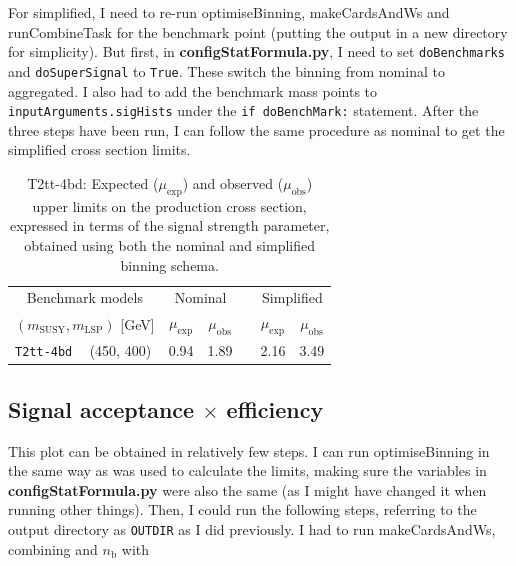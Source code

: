 For simplified, I need to re-run optimiseBinning, makeCardsAndWs and runCombineTask for the benchmark point (putting the output in a new directory for simplicity). But first, in \textbf{configStatFormula.py}, I need to set \texttt{doBenchmarks}  and \texttt{doSuperSignal} to \texttt{True}. These switch the binning from nominal to aggregated. I also had to add the benchmark mass points to \texttt{inputArguments.sigHists} under the \texttt{if doBenchMark:} statement. After the three steps have been run, I can follow the same procedure as nominal to get the simplified cross section limits.

\begin{table}[htbp]
  \centering
  \begin{tabular}{ llccccc }
    \hline
    \multicolumn{2}{c}{Benchmark models}    & \multicolumn{2}{c}{Nominal}
                                            &
                                            & \multicolumn{2}{c}{Simplified}             \\ [0.3ex]
    \cline{3-4}
    \cline{6-7}
    \multicolumn{2}{c}{$(m_{\text{SUSY}}, m_{\mathrm{LSP}})$ [GeV]}
                                            & $\mu_{\text{exp}}$
                                            & $\mu_{\text{obs}}$
                                            &
                                            & $\mu_{\text{exp}}$
                                            & $\mu_{\text{obs}}$                         \\ [0.3ex]
    \hline
    \texttt{T2tt-4bd} & (450, 400) & 0.94 & 1.89 & & 2.16 & 3.49 \\
        \hline
  \end{tabular}
  \caption{T2tt-4bd: Expected ($\mu_{\mathrm{exp}}$) and observed ($\mu_{\mathrm{obs}}$) upper limits on the production cross section, expressed in terms of the signal strength parameter, obtained using both the nominal and simplified binning schema.}
\end{table}

    
\subsection{Signal acceptance \texorpdfstring{$\times$}{x} efficiency}

This plot can be obtained in relatively few steps. I can run optimiseBinning in the same way as was used to calculate the limits, making sure the variables in \textbf{configStatFormula.py} were also the same (as I might have changed it when running other things). Then, I could run the following steps, referring to the output directory as \texttt{OUTDIR} as I did previously. I had to run makeCardsAndWs, combining \HT and $n_{\mathrm{b}}$ with

